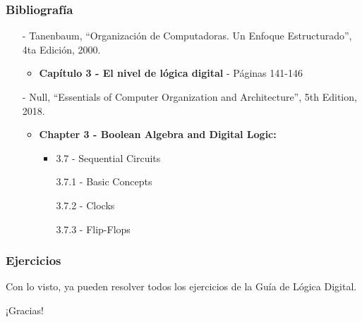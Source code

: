\documentclass[aspectratio=169]{beamer}
\begin{document}
\begin{frame}[fragile]
    \frametitle{Bibliografía}
    \begin{itemize}
     \setlength\itemsep{0.5cm}
    \item[-] \small Tanenbaum, “Organización de Computadoras. Un Enfoque Estructurado”, 4ta Edición, 2000.\\
    \begin{itemize}
     \item \textbf{Capítulo 3 - El nivel de lógica digital} - Páginas 141-146
    \end{itemize}
    \item[-] \small Null, “Essentials of Computer Organization and Architecture”, 5th Edition, 2018.\\
    \begin{itemize}
     \item \textbf{Chapter 3 - Boolean Algebra and Digital Logic:}
     \begin{itemize}
     \item 3.7 - Sequential Circuits
        \item[] 3.7.1 - Basic Concepts
        \item[] 3.7.2 - Clocks
        \item[] 3.7.3 - Flip-Flops
     \end{itemize}
    \end{itemize}
    \end{itemize}
\end{frame}

\begin{frame}[fragile]
    \frametitle{Ejercicios}
    Con lo visto, ya pueden resolver todos los ejercicios de la Guía de Lógica Digital.
\end{frame}

\begin{frame}[plain]
    \begin{center}
    \vspace{2cm}
    \huge ¡Gracias!\\
    \vspace{2cm}
    \end{center}
\end{frame}
\end{document}
